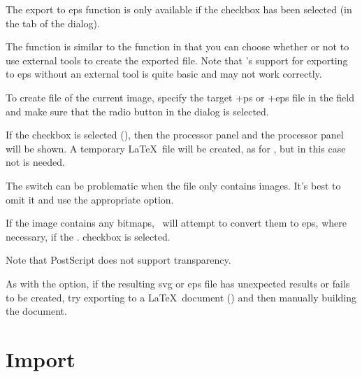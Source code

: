 The export to \gls{eps} function is only available if the
 checkbox has been selected
(in the  tab of the  dialog).


The  function is similar to the 
function in that you can choose whether or not to use external tools to
create the exported file. Note that \FlowframTk's support for
exporting to \gls{eps} without an external tool is quite basic and may not
work correctly.

To create  file of the current image, specify the target
\ext+{ps} or \ext+{eps} file in the  field and
make sure that the  radio button in the
 dialog is selected. 

If the  checkbox is
selected (), then the
 processor panel and the
 processor panel will be shown.
A temporary \LaTeX\ file will be created, as for
, but in this case  not
 is needed.

\begin{warning}
The   switch can be problematic when the file only
contains images. It's best to omit it and use the appropriate
 option.
\end{warning}


If the image contains any \glspl{bitmap}, \FlowframTk\ will attempt to convert
them to \gls{eps}, where necessary, if the .
checkbox is selected.

\begin{important}
Note that PostScript does not support transparency.
\end{important}

As with the  option, if the resulting
\gls{svg} or \gls{eps} file has unexpected results or fails to be
created, try exporting to a \LaTeX\ document
() and then manually building the document.

\section{Import}\label{sec:importimage}

